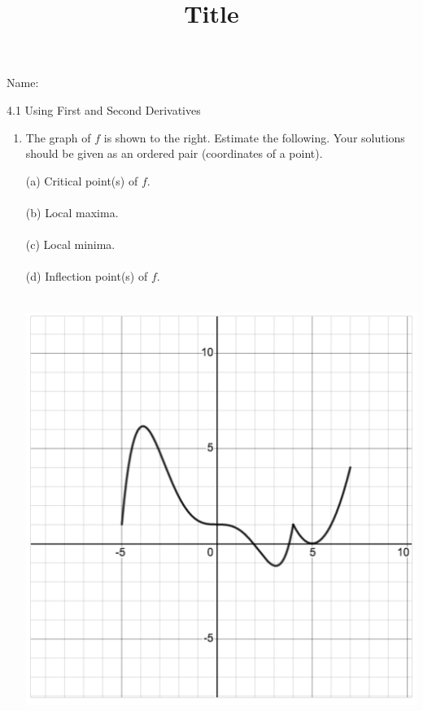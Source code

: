 \documentclass[12pt]{article}
\title{Title}
\begin{document}

 Name:
 \begin{center}\large{4.1 Using First and Second Derivatives}\end{center}

\begin{enumerate}
\item The graph of $f$ is shown to the right. Estimate the following. Your solutions should be given as an ordered pair (coordinates of a point).\\

\noindent\begin{minipage}{0.45\textwidth}%
(a) Critical point(s) of $f$.\\
\vspace{10mm}\\
(b) Local maxima.\\
\vspace{10mm}\\
(c) Local minima.\\
\vspace{10mm}\\
(d) Inflection point(s) of $f$.\\
\vspace{10mm}\\

\end{minipage}%
\hspace{5mm}
\begin{minipage}{0.3\textwidth}
\includegraphics [scale= .4]{4_1_g1}
\end{minipage}



\end{enumerate}
\end{document}

